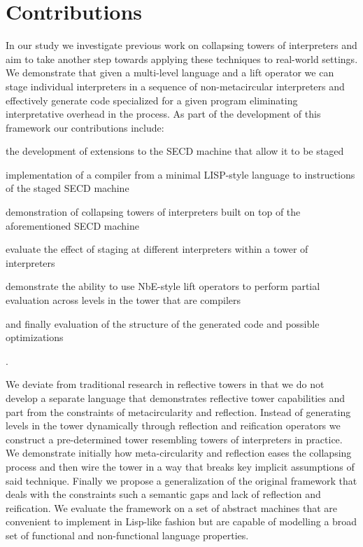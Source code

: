 \documentclass{article}
\theoremstyle{definition}
\begin{document}
\section{Contributions}
In our study we investigate previous work on collapsing towers of interpreters and aim to take another step towards applying these techniques to real-world settings. We demonstrate that given a multi-level language and a lift operator we can stage individual interpreters in a sequence of non-metacircular interpreters and effectively generate code specialized for a given program eliminating interpretative overhead in the process. As part of the development of this framework our contributions include:
\begin{enumerate*}[label=(\arabic*)]
	\item the development of extensions to the SECD machine that allow it to be staged
	\item implementation of a compiler from a minimal LISP-style language to instructions of the staged SECD machine
	\item demonstration of collapsing towers of interpreters built on top of the aforementioned SECD machine
	\item evaluate the effect of staging at different interpreters within a tower of interpreters
	\item demonstrate the ability to use NbE-style lift operators to perform partial evaluation across levels in the tower that are compilers
	\item and finally evaluation of the structure of the generated code and possible optimizations
\end{enumerate*}.

We deviate from traditional research in reflective towers in that we do not develop a separate language that demonstrates reflective tower capabilities and part from the constraints of metacircularity and reflection.
Instead of generating levels in the tower dynamically through reflection and reification operators we construct a pre-determined tower resembling towers of interpreters in practice. We demonstrate initially how meta-circularity and reflection eases the collapsing process and then wire the tower in a way that breaks key implicit assumptions of said technique. Finally we propose a generalization of the original framework that deals with the constraints such a semantic gaps and lack of reflection and reification. We evaluate the framework on a set of abstract machines that are convenient to implement in Lisp-like fashion but are capable of modelling a broad set of functional and non-functional language properties.
\end{document}
